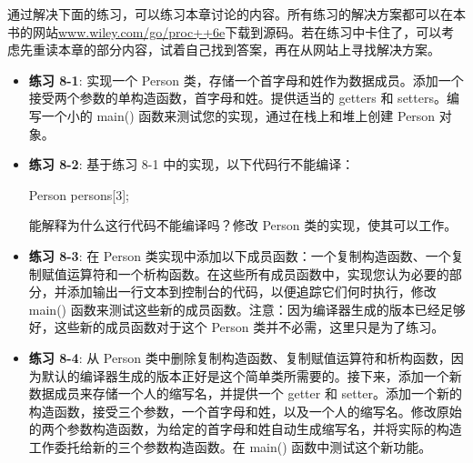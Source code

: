 通过解决下面的练习，可以练习本章讨论的内容。所有练习的解决方案都可以在本书的网站\url{www.wiley.com/go/proc++6e}下载到源码。若在练习中卡住了，可以考虑先重读本章的部分内容，试着自己找到答案，再在从网站上寻找解决方案。

\begin{itemize}
\item
\textbf{练习 8-1}: 实现一个 Person 类，存储一个首字母和姓作为数据成员。添加一个接受两个参数的单构造函数，首字母和姓。提供适当的 getters 和 setters。编写一个小的 main() 函数来测试您的实现，通过在栈上和堆上创建 Person 对象。

\item
\textbf{练习 8-2}: 基于练习 8-1 中的实现，以下代码行不能编译：

\begin{cpp}
Person persons[3];
\end{cpp}

能解释为什么这行代码不能编译吗？修改 Person 类的实现，使其可以工作。

\item
\textbf{练习 8-3}: 在 Person 类实现中添加以下成员函数：一个复制构造函数、一个复制赋值运算符和一个析构函数。在这些所有成员函数中，实现您认为必要的部分，并添加输出一行文本到控制台的代码，以便追踪它们何时执行，修改 main() 函数来测试这些新的成员函数。注意：因为编译器生成的版本已经足够好，这些新的成员函数对于这个 Person 类并不必需，这里只是为了练习。

\item
\textbf{练习 8-4}: 从 Person 类中删除复制构造函数、复制赋值运算符和析构函数，因为默认的编译器生成的版本正好是这个简单类所需要的。接下来，添加一个新数据成员来存储一个人的缩写名，并提供一个 getter 和 setter。添加一个新的构造函数，接受三个参数，一个首字母和姓，以及一个人的缩写名。修改原始的两个参数构造函数，为给定的首字母和姓自动生成缩写名，并将实际的构造工作委托给新的三个参数构造函数。在 main() 函数中测试这个新功能。
\end{itemize}